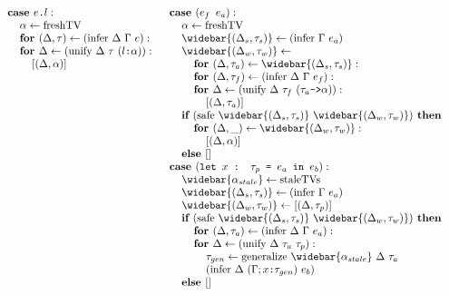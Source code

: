 \documentclass[acmsmall]{acmart}
\begin{document}
\begin{figure*}[h]
\[\begin{array}[t]{@{} l}
    \I \B{case } \code{$e$.$l$} :  
    \\
    \I\I \alpha \leftarrow \F{freshTV}
    \\
    \I\I \B{for } (\Delta, \tau) \leftarrow (\F{infer } \Delta\ \Gamma\ e):
    \\
    \I\I \B{for } \Delta \leftarrow (\F{unify } \Delta\ \tau\ (\code{$l$:$\alpha$})):
    \\
    \I\I\I [(\Delta, \alpha)]
\end{array}
\begin{array}[t]{@{} l}
    \I \B{case } (\code{$e_f$ $e_a$}) :  
    \\
    \I\I \alpha \leftarrow \F{freshTV}
    \\
    \I\I \widebar{(\Delta_s, \tau_s)} \leftarrow (\F{infer } \Gamma\ e_a)
    \\
    \I\I \widebar{(\Delta_w, \tau_w)} \leftarrow
    \\
    \I\I\I \B{for } (\Delta, \tau_a) \leftarrow \widebar{(\Delta_s, \tau_s)}:
    \\
    \I\I\I \B{for } (\Delta, \tau_f) \leftarrow (\F{infer } \Delta\ \Gamma\ e_f):
    \\
    \I\I\I \B{for } \Delta \leftarrow (\F{unify } \Delta\ \tau_f\ (\code{$\tau_a$->$\alpha$})):
    \\
    \I\I\I\I [(\Delta, \tau_a)]
    \\
    \I\I \B{if } (\F{safe } \widebar{(\Delta_s, \tau_s)}\ \widebar{(\Delta_w, \tau_w)} ) \B{ then }
    \\
    \I\I\I \B{for } (\Delta, \_) \leftarrow \widebar{(\Delta_w, \tau_w)}:
    \\
    \I\I\I\I [(\Delta, \alpha)]
    \\
    \I\I \B{else } [] 

    \\

    \I \B{case } (\code{let $x$ : $\tau_p$ = $e_a$ in $e_b$}) :  
    \\
    \I\I \widebar{\alpha_{stale}} \leftarrow \F{staleTVs}
    \\
    \I\I \widebar{(\Delta_s, \tau_s)} \leftarrow (\F{infer } \Gamma\ e_a)
    \\
    \I\I \widebar{(\Delta_w, \tau_w)} \leftarrow [(\Delta, \tau_p)]
    \\
    \I\I \B{if } (\F{safe } \widebar{(\Delta_s, \tau_s)}\ \widebar{(\Delta_w, \tau_w)} ) \B{ then }
    \\
    \I\I\I \B{for } (\Delta, \tau_a) \leftarrow (\F{infer } \Delta\ \Gamma\ e_a):
    \\
    \I\I\I \B{for } \Delta \leftarrow (\F{unify } \Delta\ \tau_a\ \tau_p):
    \\
    \I\I\I\I \tau_{gen} \leftarrow \F{generalize } \widebar{\alpha_{stale}}\ \Delta\ \tau_a
    \\
    \I\I\I\I (\F{infer } \Delta\ (\Gamma;\code{$x$:$\tau_{gen}$})\ e_b)
    \\
    \I\I \B{else } [] 


\end{array}\]
\end{figure*}
\end{document}
